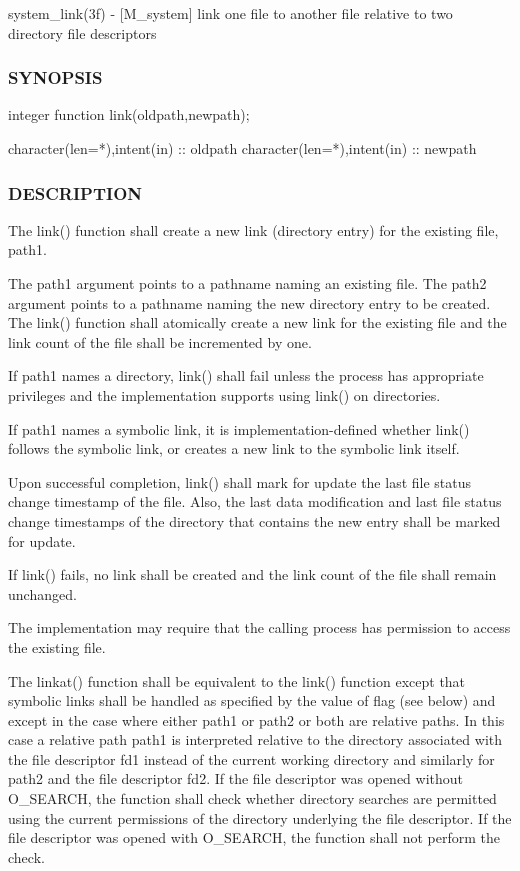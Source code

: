 system\+\_\+link(3f) -\/ \mbox{[}M\+\_\+system\mbox{]} link one file to another file relative to two directory file descriptors 

\subsubsection*{S\+Y\+N\+O\+P\+S\+IS}

\begin{DoxyVerb}integer function link(oldpath,newpath);

 character(len=*),intent(in) :: oldpath
 character(len=*),intent(in) :: newpath
\end{DoxyVerb}


\subsubsection*{D\+E\+S\+C\+R\+I\+P\+T\+I\+ON}

The link() function shall create a new link (directory entry) for the existing file, path1.

The path1 argument points to a pathname naming an existing file. The path2 argument points to a pathname naming the new directory entry to be created. The link() function shall atomically create a new link for the existing file and the link count of the file shall be incremented by one.

If path1 names a directory, link() shall fail unless the process has appropriate privileges and the implementation supports using link() on directories.

If path1 names a symbolic link, it is implementation-\/defined whether link() follows the symbolic link, or creates a new link to the symbolic link itself.

Upon successful completion, link() shall mark for update the last file status change timestamp of the file. Also, the last data modification and last file status change timestamps of the directory that contains the new entry shall be marked for update.

If link() fails, no link shall be created and the link count of the file shall remain unchanged.

The implementation may require that the calling process has permission to access the existing file.

The linkat() function shall be equivalent to the link() function except that symbolic links shall be handled as specified by the value of flag (see below) and except in the case where either path1 or path2 or both are relative paths. In this case a relative path path1 is interpreted relative to the directory associated with the file descriptor fd1 instead of the current working directory and similarly for path2 and the file descriptor fd2. If the file descriptor was opened without O\+\_\+\+S\+E\+A\+R\+CH, the function shall check whether directory searches are permitted using the current permissions of the directory underlying the file descriptor. If the file descriptor was opened with O\+\_\+\+S\+E\+A\+R\+CH, the function shall not perform the check.

